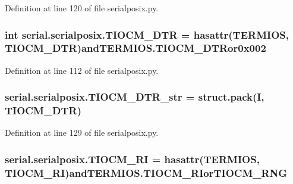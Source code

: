 Definition at line 120 of file serialposix.\+py.

\subsubsection[{\texorpdfstring{T\+I\+O\+C\+M\+\_\+\+D\+TR}{TIOCM_DTR}}]{\setlength{\rightskip}{0pt plus 5cm}int serial.\+serialposix.\+T\+I\+O\+C\+M\+\_\+\+D\+TR = hasattr({\bf T\+E\+R\+M\+I\+OS}, \textquotesingle{}T\+I\+O\+C\+M\+\_\+\+D\+TR\textquotesingle{})and\+T\+E\+R\+M\+I\+O\+S.\+T\+I\+O\+C\+M\+\_\+\+D\+T\+Ror0x002}\hypertarget{namespaceserial_1_1serialposix_a3671470f6e68d32ece2b66e4de3f6e1f}{}\label{namespaceserial_1_1serialposix_a3671470f6e68d32ece2b66e4de3f6e1f}


Definition at line 112 of file serialposix.\+py.

\subsubsection[{\texorpdfstring{T\+I\+O\+C\+M\+\_\+\+D\+T\+R\+\_\+str}{TIOCM_DTR_str}}]{\setlength{\rightskip}{0pt plus 5cm}serial.\+serialposix.\+T\+I\+O\+C\+M\+\_\+\+D\+T\+R\+\_\+str = struct.\+pack(\textquotesingle{}I\textquotesingle{}, {\bf T\+I\+O\+C\+M\+\_\+\+D\+TR})}\hypertarget{namespaceserial_1_1serialposix_a5e9a73c38202157cb437228348e421fc}{}\label{namespaceserial_1_1serialposix_a5e9a73c38202157cb437228348e421fc}


Definition at line 129 of file serialposix.\+py.

\subsubsection[{\texorpdfstring{T\+I\+O\+C\+M\+\_\+\+RI}{TIOCM_RI}}]{\setlength{\rightskip}{0pt plus 5cm}serial.\+serialposix.\+T\+I\+O\+C\+M\+\_\+\+RI = hasattr({\bf T\+E\+R\+M\+I\+OS}, \textquotesingle{}T\+I\+O\+C\+M\+\_\+\+RI\textquotesingle{})and\+T\+E\+R\+M\+I\+O\+S.\+T\+I\+O\+C\+M\+\_\+\+R\+Ior\+T\+I\+O\+C\+M\+\_\+\+R\+NG}\hypertarget{namespaceserial_1_1serialposix_a25b961f0b21e0237dd842ac4065d54e2}{}\label{namespaceserial_1_1serialposix_a25b961f0b21e0237dd842ac4065d54e2}


